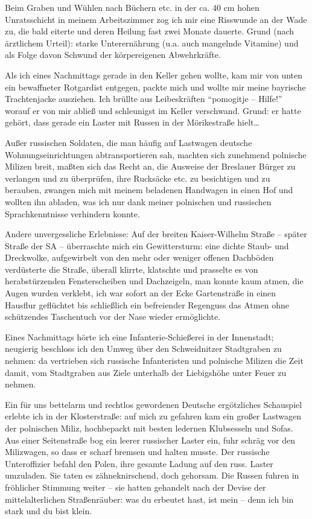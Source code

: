 \documentclass[a5paper,pagesize,10pt,twoside=true]{scrbook}
\renewcommand{\marginpar}[2][]{}
\begin{document}
Beim Graben und Wühlen nach Büchern etc. in der ca. 40 cm hohen Unratsschicht in meinem Arbeitszimmer zog ich mir eine Risswunde an der Wade zu, die bald eiterte und deren Heilung fast zwei Monate dauerte. Grund (nach ärztlichem Urteil): starke Unterernährung (u.a. auch mangelnde Vitamine) und als Folge davon Schwund der körpereigenen Abwehrkräfte.

Als ich eines Nachmittags gerade in den Keller gehen wollte, kam mir von unten ein bewaffneter Rotgardist entgegen, packte mich und wollte mir meine bayrische Trachtenjacke ausziehen. Ich brüllte aus Leibeskräften \enquote{pomogitje -- Hilfe!} worauf er von mir abließ und schleunigst im Keller verschwand. Grund: er hatte gehört, dass gerade ein Laster mit Russen in der Mörikestraße hielt\dots

Außer russischen Soldaten, die man häufig auf Lastwagen deutsche Wohnungseinrichtungen abtransportieren sah, machten sich zunehmend polnische Milizen breit, maßten sich das Recht an, die Ausweise der Breslauer Bürger zu verlangen und zu überprüfen, ihre Rucksäcke etc. zu besichtigen und zu berauben, zwangen mich mit meinem beladenen Handwagen in einen Hof und wollten ihn abladen, was ich nur dank meiner polnischen und russischen Sprachkenntnisse verhindern konnte.

Andere unvergessliche Erlebnisse: Auf der breiten Kaiser-Wilhelm Straße -- später Straße der SA -- \marginpar{96} überraschte mich ein Gewittersturm: eine dichte Staub- und Dreckwolke, aufgewirbelt von den mehr oder weniger offenen Dachböden verdüsterte die Straße, überall klirrte, klatschte und prasselte es von herabstürzenden Fensterscheiben und Dachzeigeln, man konnte kaum atmen, die Augen wurden verklebt, ich war sofort an der Ecke Gartenstraße in einen Hausflur geflüchtet bis schließlich ein befreiender Regenguss das Atmen ohne schützendes Taschentuch vor der Nase wieder ermöglichte.

Eines Nachmittags hörte ich eine Infanterie-Schießerei in der Innenstadt; neugierig beschloss ich den Umweg über den Schweidnitzer Stadtgraben zu nehmen: da vertrieben sich russische Infanteristen und polnische Milizen die Zeit damit, vom Stadtgraben aus Ziele unterhalb der Liebigshöhe unter Feuer zu nehmen.

Ein für uns bettelarm und rechtlos gewordenen Deutsche ergötzliches Schauspiel erlebte ich in der Klosterstraße: auf mich zu gefahren kam ein großer Lastwagen der polnischen Miliz, hochbepackt mit besten ledernen Klubsesseln und Sofas. Aus einer Seitenstraße bog ein leerer russischer Laster ein, fuhr schräg vor den Milizwagen, so dass er scharf bremsen und \marginpar{97} halten musste. Der russische Unteroffizier befahl den Polen, ihre gesamte Ladung auf den russ. Laster umzuladen. Sie taten es zähneknirschend, doch gehorsam. Die Russen fuhren in fröhlicher Stimmung weiter -- sie hatten gehandelt nach der Devise der mittelalterlichen Straßenräuber: was du erbeutet hast, ist mein -- denn ich bin stark und du bist klein.
\end{document}
